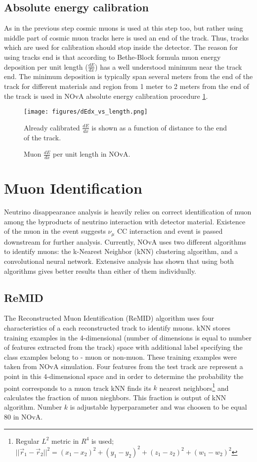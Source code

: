 \subsection{Absolute energy calibration}
As in the previous step cosmic muons is used at this step too, but rather using middle part of cosmic muon tracks
here is used an end of the track. Thus, tracks which are used for calibration should stop inside the detector. 
The reason for using tracks end is that according to Bethe-Block formula \cite{rpf} muon energy deposition per 
unit length ($\frac{dE}{dx}$) has a well understood minimum near the track end. The minimum deposition is typically
span several meters from the end of the track for different materials and region from 1 meter to 2 meters from
the end of the track is used in NOvA absolute energy calibration procedure \ref{fig:dEdx_vs_length}.
\begin{figure}[t]
\texttt{[image: figures/dEdx\_vs\_length.png]}
\centering
\caption{Muon $\frac{dE}{dx}$ per unit length in NOvA.}
{Already calibrated $\frac{dE}{dx}$ is shown as a function of distance to the end of the track.}
\label{fig:dEdx_vs_length}
\end{figure}

\section{Muon Identification}
Neutrino disappearance analysis is heavily relies on correct identification of muon among the byproducts of 
neutrino interaction with detector material. Existence of the muon in the event suggests $\nu_\mu$ CC interaction
and event is passed downstream for further analysis. Currently, NOvA uses two different algorithms to identify 
muons: the k-Nearest Neighbor (kNN) clustering algorithm, and a convolutional neural network. Extensive analysis 
has shown that using both algorithms gives better results than either of them individually.

\subsection{ReMID}
The Reconstructed Muon Identification (ReMID) algorithm uses four characteristics of a each reconstructed track
to identify muons. kNN stores training examples in the 4-dimensional (number of dimensions
is equal to number of features extracted from the track) space with additional label specifying the class examples
belong to - muon or non-muon. These training examples were taken from NOvA simulation. Four features from the 
test track are represent a point in this 4-dimensional space and in order to determine the probability the point 
corresponds to a muon track kNN finds its $k$ nearest neighbors\footnote{Regular $L^2$ metric in $R^4$ is used;
$||\vec{r}_1 - \vec{r}_2||^2 = (x_1-x_2)^2 + (y_1-y_2)^2 + (z_1-z_2)^2 + (w_1-w_2)^2$} and calculates the 
fraction of muon nieghbors. This fraction is output of kNN algorithm. Number $k$ is adjustable hyperparameter 
and was choosen to be equal 80 in NOvA. 

